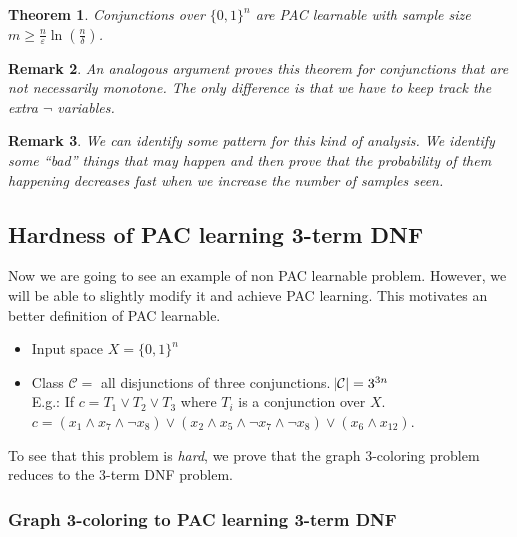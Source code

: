\documentclass[12pt, letterpaper]{article}
\numberwithin{equation}{section} %
\newcommand{\mc}{\mathcal}
\newcommand{\ve}{\varepsilon}
\newtheorem{theorem}{Theorem}[section]
\newtheorem{remark}[theorem]{Remark}
\theoremstyle{definition}
\theoremstyle{remark}
\begin{document}
\begin{theorem}
    Conjunctions over $\lbrace 0,1 \rbrace^n$ are PAC learnable with sample size  $m \geq \frac n\ve \ln\left(\frac n\delta\right)$.
\end{theorem}

\begin{remark}
    An analogous argument proves this theorem for conjunctions that are not necessarily monotone. The only difference is that we have to keep track the extra $\lnot$ variables.
\end{remark}

\begin{remark}
    We can identify some pattern for this kind of analysis. We identify some ``bad'' things that may happen and then prove that the probability of them happening decreases fast when we increase the number of samples seen.
\end{remark}


\subsection{Hardness of PAC learning 3-term DNF}

Now we are going to see an example of non PAC learnable problem. However, we will be able to slightly modify it and achieve PAC learning. This motivates an better definition of PAC learnable.
\begin{itemize}
    \item Input space $X = \lbrace 0, 1 \rbrace^n$
    \item Class $\mc C = $ all disjunctions of three conjunctions. $\abs{\mc C} = 3^{3n}$\\
          E.g.: If $c = T_1 \lor T_2 \lor T_3$ where $T_i$ is a conjunction over $X$.\\
          $c = \left(x_1 \wedge x_7 \wedge \lnot x_8 \right) \lor \left(x_2 \wedge x_5 \wedge \lnot x_7 \wedge \lnot x_8\right) \lor \left(x_6 \wedge x_{12}\right)$.
\end{itemize}
To see that this problem is \emph{hard}, we prove that the graph 3-coloring problem reduces to the 3-term DNF problem. 

\subsubsection*{Graph 3-coloring to PAC learning 3-term DNF}
\end{document}
